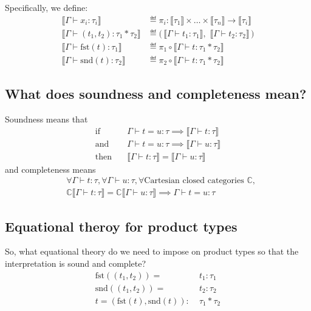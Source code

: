 Specifically, we define:
\begin{align*}
    \llbracket \Gamma \vdash x_i : \tau_i \rrbracket &\eqdef
    \pi_i : \llbracket \tau_1 \rrbracket \times \ldots \times \llbracket \tau_n
    \rrbracket \rightarrow \llbracket \tau_i \rrbracket
    \\
    \llbracket \Gamma \vdash (t_1, t_2) : \tau_1 \ast \tau_2 \rrbracket &\eqdef
    \big(\,\llbracket \Gamma \vdash t_1 : \tau_1 \rrbracket,\,\,
           \llbracket \Gamma \vdash t_2 : \tau_2 \rrbracket\,\big)
    \\
    \llbracket \Gamma \vdash \text{fst}(t) : \tau_1 \rrbracket &\eqdef
    \pi_1 \circ \llbracket \Gamma \vdash t : \tau_1 \ast \tau_2 \rrbracket
    \\
    \llbracket \Gamma \vdash \text{snd}(t) : \tau_2 \rrbracket &\eqdef
    \pi_2 \circ \llbracket \Gamma \vdash t : \tau_1 \ast \tau_2 \rrbracket
\end{align*}

\subsection{What does soundness and completeness mean?}

Soundness means that
\begin{align*}
    \text{if}\quad& \Gamma \vdash t = u : \tau \implies \llbracket \Gamma \vdash t
    : \tau \rrbracket
    \\
    \text{and}\quad& \Gamma \vdash t = u : \tau \implies \llbracket \Gamma \vdash u
    : \tau \rrbracket
    \\
    \text{then}\quad& \llbracket \Gamma \vdash t : \tau \rrbracket = \llbracket
    \Gamma \vdash u : \tau \rrbracket
\end{align*}
and completeness means
\begin{align*}
    &\forall \Gamma \vdash t : \tau, \forall \Gamma \vdash u : \tau, \forall
    \text{Cartesian closed categories } \mathbb{C},
    \\
    &\mathbb{C}\llbracket \Gamma \vdash t : \tau \rrbracket =
    \mathbb{C}\llbracket \Gamma \vdash u : \tau \rrbracket \implies
    \Gamma \vdash t = u : \tau
\end{align*}

\subsection{Equational theroy for product types}

So, what equational theory do we need to impose on product types so that the
interpretation is sound and complete?
\begin{align*}
    \text{fst}((t_1, t_2)) =\; &t_1 : \tau_1
    \\
    \text{snd}((t_1, t_2)) =\; &t_2 : \tau_2
    \\
    t = (\text{fst}(t), \text{snd}(t)) :\; &\tau_1 \ast \tau_2
\end{align*}

